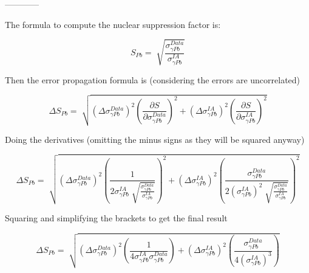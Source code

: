 \documentclass[a4paper,12pt]{article}
\begin{document}
------------

The formula to compute the nuclear suppression factor is:

\begin{equation}
S_{Pb} = \sqrt[]{\frac{\sigma^{Data}_{\gamma Pb}}{\sigma^{IA}_{\gamma Pb}}}
\end{equation}

Then the error propagation formula is (considering the errors are uncorrelated)

\begin{equation}
\Delta S_{Pb} = \sqrt[]{ (\Delta{\sigma^{Data}_{\gamma Pb}})^2 \left(\frac{\partial S}{\partial \sigma^{Data}_{\gamma Pb}}\right)^2 + (\Delta{\sigma^{IA}_{\gamma Pb}})^2 \left(\frac{\partial S}{\partial \sigma^{IA}_{\gamma Pb}}\right)^2 }
\end{equation}

Doing the derivatives (omitting the minus signs as they will be squared anyway)

\begin{equation}
\Delta S_{Pb} = \sqrt[]{ (\Delta{\sigma^{Data}_{\gamma Pb}})^2 \left(\frac{1}{2 \sigma^{IA}_{\gamma Pb}  \sqrt[]{\frac{\sigma^{Data}_{\gamma Pb}}{\sigma^{IA}_{\gamma Pb}}} }\right)^2 + (\Delta{\sigma^{IA}_{\gamma Pb}})^2 \left(\frac{ \sigma^{Data}_{\gamma Pb} }{ 2 (\sigma^{IA}_{\gamma Pb})^2  \sqrt[]{\frac{\sigma^{Data}_{\gamma Pb}}{\sigma^{IA}_{\gamma Pb}}} }\right)^2 }
\end{equation}

Squaring and simplifying the brackets to get the final result

\begin{equation}
\Delta S_{Pb} = \sqrt[]{ (\Delta{\sigma^{Data}_{\gamma Pb}})^2 \left(\frac{1}{4 \sigma^{IA}_{\gamma Pb} \sigma^{Data}_{\gamma Pb}  }\right) + (\Delta{\sigma^{IA}_{\gamma Pb}})^2 \left(\frac{ \sigma^{Data}_{\gamma Pb} }{ 4 (\sigma^{IA}_{\gamma Pb})^3  }\right) }
\end{equation}




\end{document}
